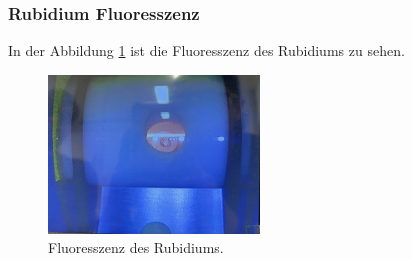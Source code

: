\subsubsection{Rubidium Fluoresszenz}
\label{sec:fluoresszenz}
In der Abbildung \ref{fig:fluoresszenz} ist die Fluoresszenz des Rubidiums zu sehen.
\begin{figure}[H]
    \centering
    \includegraphics[width=0.5\textwidth]{pictures/Fluoresszenz.JPG}
    \caption{Fluoresszenz des Rubidiums.}
    \label{fig:fluoresszenz}
\end{figure}

